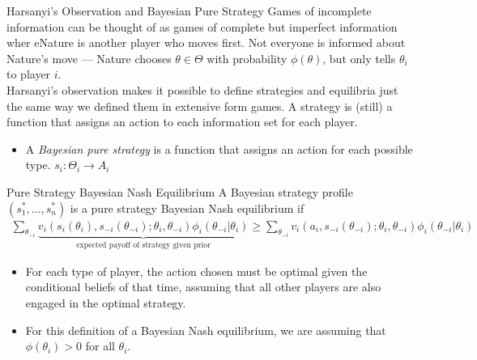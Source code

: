 \documentclass[10pt]{extarticle}
\begin{document}
  \begin{problem}{Harsanyi's Observation and Bayesian Pure Strategy}
    Games of incomplete information can be thought of as games of complete but imperfect information wher eNature is another player who moves first. Not everyone is informed about Nature's move --- Nature chooses $\theta \in \Theta$ with probability $\phi(\theta)$, but only tells $\theta_i$ to player $i$.\\

    Harsanyi's observation makes it possible to define strategies and equilibria just the same way we defined them in extensive form games. A strategy is (still) a function that assigns an action to each information set for each player.
    \begin{itemize}
      \item A \textit{Bayesian pure strategy} is a function that assigns an action for each possible type. $s_i: \Theta_i \rightarrow A_i$
    \end{itemize}
  \end{problem}
  \begin{problem}{Pure Strategy Bayesian Nash Equilibrium}
    A Bayesian strategy profile $(s_1^{\ast},\dots,s_{n}^{\ast})$ is a pure strategy Bayesian Nash equilibrium if
    \begin{align*}
      \sum_{\theta_{-i}}\underbrace{v_i(s_i(\theta_i),s_{-i}(\theta_{-i});\theta_i,\theta_{-i})\phi_{i}(\theta_{-i}| \theta_i)}_{\text{expected payoff of strategy given prior}} \geq \sum_{\theta_{-i}}v_i(a_i,s_{-i}(\theta_{-i});\theta_i,\theta_{-i}) \phi_{i}(\theta_{-i}|\theta_i)
    \end{align*}
    \begin{itemize}
      \item For each type of player, the action chosen must be optimal given the conditional beliefs of that time, assuming that all other players are also engaged in the optimal strategy.
      \item For this definition of a Bayesian Nash equilibrium, we are assuming that $\phi(\theta_i) > 0$ for all $\theta_i$.
    \end{itemize}
  \end{problem}
\end{document}
